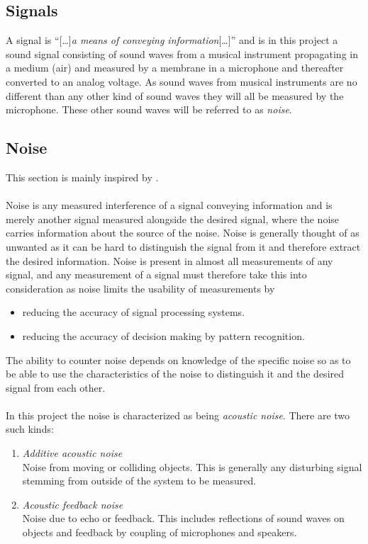 \subsection{Signals}
A signal is ``[\dots]\textit{a means of conveying information}[\dots]'' \cite{page 1, signal_noise} and is in this project a sound signal consisting of sound waves from a musical instrument propagating in a medium (air) and measured by a membrane in a microphone and thereafter converted to an analog voltage. As sound waves from musical instruments are no different than any other kind of sound waves they will all be measured by the microphone. These other sound waves will be referred to as \textit{noise}.
\subsection{Noise}
This section is mainly inspired by \cite{chapter 2, signal_noise}. \\ \\
Noise is any measured interference of a signal conveying information and is merely another signal measured alongside the desired signal, where the noise carries information about the source of the noise.  Noise is generally thought of as unwanted as it can be hard to distinguish the signal from it and therefore extract the desired information. Noise is present in almost all measurements of any signal, and any measurement of a signal must therefore take this into consideration as noise limits the usability of measurements by
\begin{itemize}
\item reducing the accuracy of signal processing systems.
\item reducing the accuracy of decision making by pattern recognition.
\end{itemize}
The ability to counter noise depends on knowledge of the specific noise so as to be able to use the characteristics of the noise to distinguish it and the desired signal from each other.
\\ \\
In this project the noise is characterized as being \textit{acoustic noise}. There are two such kinds:
\begin{enumerate}
\item \textit{Additive acoustic noise} \\
Noise from moving or colliding objects. This is generally any disturbing signal stemming from outside of the system to be measured.
\item \textit{Acoustic feedback noise} \\
Noise due to echo or feedback. This includes reflections of sound waves on objects and feedback by coupling of microphones and speakers.
\end{enumerate}

